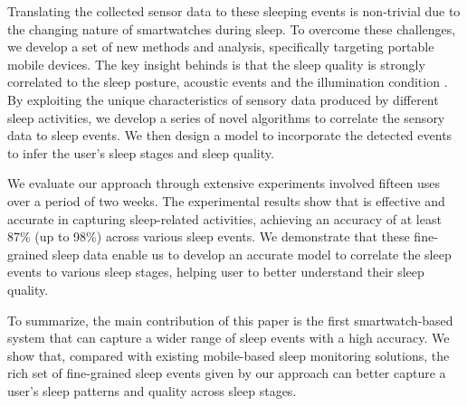 Translating the collected sensor data to these sleeping events is non-trivial due to the changing nature of smartwatches during sleep. To
overcome these challenges, we develop a set of new methods and analysis, specifically targeting portable mobile devices.  The key insight
behinds {\systemname} is that the sleep quality is strongly correlated to the sleep posture, acoustic events and the illumination condition
\cite{shelgikar2016sleep}. By exploiting the unique characteristics of sensory data produced by different sleep activities, we develop a
series of novel algorithms to correlate the sensory data to sleep events. We then design a model to incorporate the detected events to
infer the user's sleep stages and sleep quality.%

We evaluate our approach through extensive experiments involved fifteen uses over a period of two weeks. The experimental results show that
{\systemname} is effective and accurate in capturing sleep-related activities, achieving an accuracy of at least 87\% (up to 98\%) across
various sleep events. We demonstrate that these fine-grained sleep data enable us to develop an accurate model to correlate the sleep
events to various sleep stages, helping user to better understand their sleep quality.

To summarize, the main contribution of this paper is the first smartwatch-based system that can capture a wider range of sleep events with a high
accuracy. We show that, compared with existing mobile-based sleep monitoring solutions, the rich set of fine-grained sleep events given by
our approach can better capture a user's sleep patterns and quality across sleep stages.
